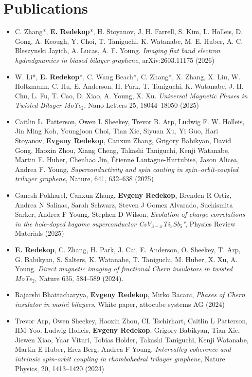 \documentclass[11pt]{article}
\begin{document}
\section*{Publications}
\begin{itemize}[leftmargin=*]
    \item C. Zhang*, \textbf{E. Redekop}*, H. Stoyanov, J. H. Farrell, S. Kim, L. Holleis, D. Gong, A. Keough, Y. Choi, T. Taniguchi, K. Watanabe, M. E. Huber, A. C. Bleszynski Jayich, A. Lucas, A. F. Young. \textit{Imaging flat band electron hydrodynamics in biased bilayer graphene}, arXiv:2603.11175 (2026)
    \item W. Li*, \textbf{E. Redekop}*, C. Wang Beach*, C. Zhang*, X. Zhang, X. Liu, W. Holtzmann, C. Hu, E. Anderson, H. Park, T. Taniguchi, K. Watanabe, J.-H. Chu, L. Fu, T. Cao, D. Xiao, A. Young, X. Xu. \textit{Universal Magnetic Phases in Twisted Bilayer MoTe$_2$}, Nano Letters 25, 18044--18050 (2025)
    \item Caitlin L. Patterson, Owen I. Sheekey, Trevor B. Arp, Ludwig F. W. Holleis, Jin Ming Koh, Youngjoon Choi, Tian Xie, Siyuan Xu, Yi Guo, Hari Stoyanov, \textbf{Evgeny Redekop}, Canxun Zhang, Grigory Babikyan, David Gong, Haoxin Zhou, Xiang Cheng, Takashi Taniguchi, Kenji Watanabe, Martin E. Huber, Chenhao Jin, Étienne Lantagne-Hurtubise, Jason Alicea, Andrea F. Young, \textit{Superconductivity and spin canting in spin–orbit-coupled trilayer graphene}, Nature, 641, 632–638 (2025)
    \item Ganesh Pokharel, Canxun Zhang, \textbf{Evgeny Redekop}, Brenden R Ortiz, Andrea N Salinas, Sarah Schwarz, Steven J Gomez Alvarado, Suchismita Sarker, Andrea F Young, Stephen D Wilson, \textit{Evolution of charge correlations in the hole-doped kagome superconductor CsV$_{3-x}$Ti$_x$Sb$_5$"}, Physics Review Materials (2025)
    \item \textbf{E. Redekop}, C. Zhang, H. Park, J. Cai, E. Anderson, O. Sheekey, T. Arp, G. Babikyan, S. Salters, K. Watanabe, T. Taniguchi, M. Huber, X. Xu, A. Young. \textit{Direct magnetic imaging of fractional Chern insulators in twisted MoTe$_2$}, Nature 635, 584–589 (2024).
    \item Rajarshi Bhattacharyya, \textbf{Evgeny Redekop}, Mirko Bacani, \textit{Phases of Chern insulator in moiré bilayers}, White paper, attocube systems AG (2024)
    \item Trevor Arp, Owen Sheekey, Haoxin Zhou, CL Tschirhart, Caitlin L Patterson, HM Yoo, Ludwig Holleis, \textbf{Evgeny Redekop}, Grigory Babikyan, Tian Xie, Jiewen Xiao, Yaar Vituri, Tobias Holder, Takashi Taniguchi, Kenji Watanabe, Martin E Huber, Erez Berg, Andrea F Young, \textit{Intervalley coherence and intrinsic spin-orbit coupling in rhombohedral trilayer graphene}, Nature Physics,  20, 1413–1420 (2024)

\end{itemize}
\end{document}

